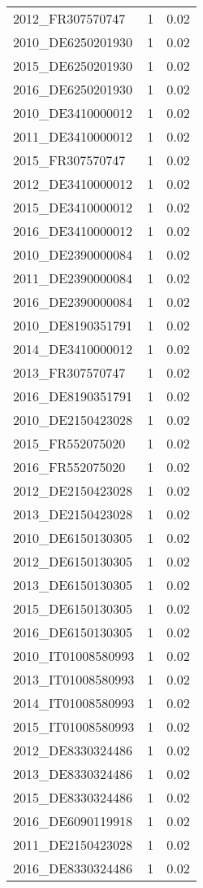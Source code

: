 \begin{table*}[htbp]
\begin{tabular}{lrr}
2012_FR307570747 & 1 & 0.02 \\
2010_DE6250201930 & 1 & 0.02 \\
2015_DE6250201930 & 1 & 0.02 \\
2016_DE6250201930 & 1 & 0.02 \\
2010_DE3410000012 & 1 & 0.02 \\
2011_DE3410000012 & 1 & 0.02 \\
2015_FR307570747 & 1 & 0.02 \\
2012_DE3410000012 & 1 & 0.02 \\
2015_DE3410000012 & 1 & 0.02 \\
2016_DE3410000012 & 1 & 0.02 \\
2010_DE2390000084 & 1 & 0.02 \\
2011_DE2390000084 & 1 & 0.02 \\
2016_DE2390000084 & 1 & 0.02 \\
2010_DE8190351791 & 1 & 0.02 \\
2014_DE3410000012 & 1 & 0.02 \\
2013_FR307570747 & 1 & 0.02 \\
2016_DE8190351791 & 1 & 0.02 \\
2010_DE2150423028 & 1 & 0.02 \\
2015_FR552075020 & 1 & 0.02 \\
2016_FR552075020 & 1 & 0.02 \\
2012_DE2150423028 & 1 & 0.02 \\
2013_DE2150423028 & 1 & 0.02 \\
2010_DE6150130305 & 1 & 0.02 \\
2012_DE6150130305 & 1 & 0.02 \\
2013_DE6150130305 & 1 & 0.02 \\
2015_DE6150130305 & 1 & 0.02 \\
2016_DE6150130305 & 1 & 0.02 \\
2010_IT01008580993 & 1 & 0.02 \\
2013_IT01008580993 & 1 & 0.02 \\
2014_IT01008580993 & 1 & 0.02 \\
2015_IT01008580993 & 1 & 0.02 \\
2012_DE8330324486 & 1 & 0.02 \\
2013_DE8330324486 & 1 & 0.02 \\
2015_DE8330324486 & 1 & 0.02 \\
2016_DE6090119918 & 1 & 0.02 \\
2011_DE2150423028 & 1 & 0.02 \\
2016_DE8330324486 & 1 & 0.02 \\

\end{tabular}
\end{table*}
